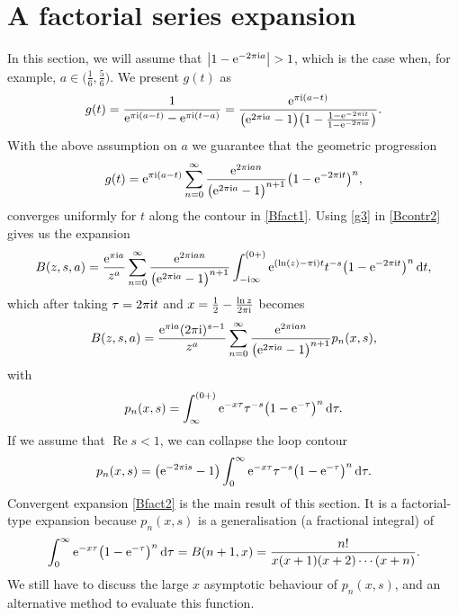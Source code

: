 \documentclass[pdftex]{sigma}
\numberwithin{equation}{section}
\def\expe{{\rm e}}
\def\iunit{{\rm i}}
\def\id{\,{\rm d}}
\begin{document}
\section{A factorial series expansion}\label{Sect:factorial}
In this section, we will assume that $\bigl|1-\expe^{-2\pi\iunit a}\bigr|>1$, which is the case when,
for example, $a\in\bigl(\frac16,\frac56\bigr)$. We present $g(t)$ as
\begin{gather*}%
 g(t)=\frac{1}{\expe^{\pi\iunit(a-t)}-\expe^{\pi\iunit(t-a)}}
 =\frac{\expe^{\pi\iunit(a-t)}}{\bigl(\expe^{2\pi\iunit a}-1\bigr)
 \bigl(1-\frac{1-\expe^{-2\pi\iunit t}}
 {1-\expe^{-2\pi\iunit a}}\bigr)}.
\end{gather*}
With the above assumption on $a$ we guarantee that the geometric progression
\begin{equation}\label{g3}
 g(t)=\expe^{\pi\iunit(a-t)}\sum_{n=0}^\infty
 \frac{\expe^{2\pi\iunit an}}{\bigl(\expe^{2\pi\iunit a}-1\bigr)^{n+1}}
 \bigl(1-\expe^{-2\pi\iunit t}\bigr)^n,
\end{equation}
converges uniformly for $t$ along the contour in \eqref{Bfact1}.
Using \eqref{g3} in \eqref{Bcontr2} gives us the expansion
\begin{equation}\label{Bfact1}
 B(z,s,a)=\frac{\expe^{\pi\iunit a}}{z^{a}}\sum_{n=0}^\infty
 \frac{\expe^{2\pi\iunit an}}{\bigl(\expe^{2\pi\iunit a}-1\bigr)^{n+1}}
 \int_{-\iunit\infty}^{(0+)}\expe^{(\ln(z)-\pi\iunit)t}t^{-s}\bigl(1-\expe^{-2\pi\iunit t}\bigr)^n\id t,
\end{equation}
which after taking $\tau=2\pi\iunit t$ and $x=\frac12-\frac{\ln z}{2\pi\iunit}$ becomes
\begin{equation}\label{Bfact2}
 B(z,s,a)=\frac{\expe^{\pi\iunit a}(2\pi\iunit)^{s-1}}{z^{a}}
 \sum_{n=0}^\infty
 \frac{\expe^{2\pi\iunit an}}{\bigl(\expe^{2\pi\iunit a}-1\bigr)^{n+1}}
 p_n(x,s),
\end{equation}
with
\begin{equation}\label{pn1}
 p_n(x,s)=\int_{\infty}^{(0+)}\expe^{-x\tau}\tau^{-s}\bigl(1-\expe^{-\tau}\bigr)^n\id\tau.
\end{equation}
If we assume that $\operatorname{Re} s<1$, we can collapse the loop contour
\begin{equation*}%
 p_n(x,s)=\bigl(\expe^{-2\pi\iunit s}-1\bigr)
 \int_0^{\infty}\expe^{-x\tau}\tau^{-s}\bigl(1-\expe^{-\tau}\bigr)^n\id\tau.
\end{equation*}
Convergent expansion \eqref{Bfact2} is the main result of this section.
It is a factorial-type expansion because $p_n(x,s)$
is a generalisation (a fractional integral) of
\begin{equation*}%
 \int_0^{\infty}\expe^{-x\tau}\bigl(1-\expe^{-\tau}\bigr)^n\id\tau=B(n+1,x)=
 \frac{n!}{x(x+1)(x+2)\cdots(x+n)}.
\end{equation*}
We still have to discuss the large $x$ asymptotic behaviour of $p_n(x,s)$,
and an alternative method to evaluate this function.
\end{document}

